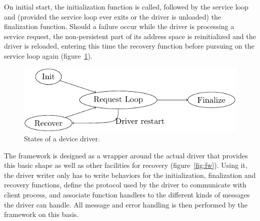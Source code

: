 \documentclass{acm_proc_article-sp}
\begin{document}
On initial start, the initialization function is called, followed by the service loop and (provided the service loop ever exits or the driver is unloaded) the finalization function. Should a failure occur while the driver is processing a service request, the non-persistent part of its address space is reinitialized and the driver is reloaded, entering this time the recovery function before pursuing on the service loop again (figure~\ref{fig:driverstatemachine}).

\begin{figure}[ht]
\centering
\includegraphics[scale=0.6]{figures/driverstatemachine}
\caption{States of a device driver.}
\label{fig:driverstatemachine}
\end{figure}


The framework is designed as a wrapper around the actual driver that provides this basic shape as well as other facilities for recovery (figure~\ref{fig:fw}). Using it, the driver writer only has to write behaviors for the initialization, finalization and recovery functions, define the protocol used by the driver to communicate with client process, and associate function handlers to the different kinds of messages the driver can handle. All message and error handling is then performed by the framework on this basis.
\end{document}
